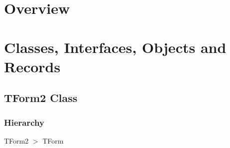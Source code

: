 \documentclass{report}
\newif\ifpdf
\begin{document}
\section{Overview}
\begin{description}
\item[\texttt{\begin{ttfamily}TForm2\end{ttfamily} Class}]
\end{description}
\section{Classes, Interfaces, Objects and Records}
\ifpdf
\subsection*{\large{\textbf{TForm2 Class}}\normalsize\hspace{1ex}\hrulefill}
\else
\subsection*{TForm2 Class}
\fi
\label{settings.TForm2}
\subsubsection*{\large{\textbf{Hierarchy}}\normalsize\hspace{1ex}\hfill}
TForm2 {$>$} TForm
\end{document}
